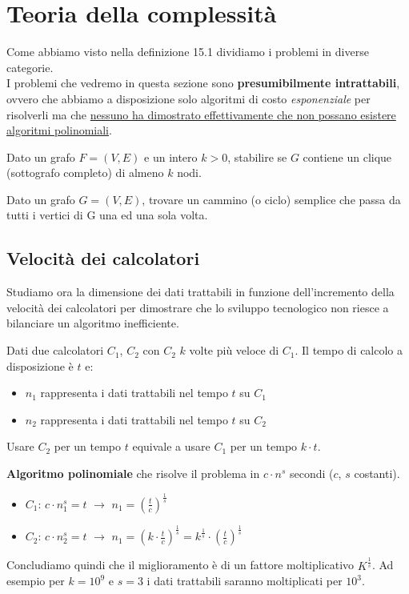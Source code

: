 \newpage
\section{Teoria della complessità}
Come abbiamo visto nella definizione 15.1 dividiamo i problemi in diverse categorie.\\
I problemi che vedremo in questa sezione sono \textbf{presumibilmente intrattabili}, ovvero che abbiamo a disposizione solo algoritmi di costo \emph{esponenziale} per risolverli ma che \ul{nessuno ha dimostrato effettivamente che non possano esistere algoritmi polinomiali}.

\begin{example}
	Dato un grafo $F= (V,E)$ e un intero $k > 0$, stabilire se $G$ contiene un clique (sottografo completo) di almeno $k$ nodi.
\end{example}

\begin{example}
	Dato un grafo $G=(V,E)$, trovare un cammino (o ciclo) semplice che passa da tutti i vertici di G una ed una sola volta.
\end{example}

\subsection{Velocità dei calcolatori}
Studiamo ora la dimensione dei dati trattabili in funzione dell'incremento della velocità dei calcolatori per dimostrare che lo sviluppo tecnologico non riesce a bilanciare un algoritmo inefficiente.

Dati due calcolatori $C_1$, $C_2$ con $C_2$ $k$ volte più veloce di $C_1$. Il tempo di calcolo a disposizione è $t$ e:
\begin{itemize}
	\item $n_1$ rappresenta i dati trattabili nel tempo $t$ su $C_1$
	\item $n_2$ rappresenta i dati trattabili nel tempo $t$ su $C_2$
\end{itemize}

\begin{observation}
	Usare $C_2$ per un tempo $t$ equivale a usare $C_1$ per un tempo $k \cdot t$.
\end{observation}

\noindent\textbf{Algoritmo polinomiale} che risolve il problema in $c \cdot n^s$ secondi ($c$, $s$ costanti).
\begin{itemize}
	\item $C_1$: $c \cdot n_1^s = t$ $\longrightarrow$ $n_1 = (\frac{t}{c})^\frac{1}{s}$
	\item $C_2$: $c \cdot n_2^s = t$ $\longrightarrow$ $n_1 = (k \cdot \frac{t}{c})^\frac{1}{s} = k^{\frac{1}{s}} \cdot (\frac{t}{c})^\frac{1}{s}$
\end{itemize} 
Concludiamo quindi che il miglioramento è di un fattore moltiplicativo $K^\frac{1}{s}$. Ad esempio per $k = 10^9$ e $s=3$ i dati trattabili saranno moltiplicati per $10^3$.

